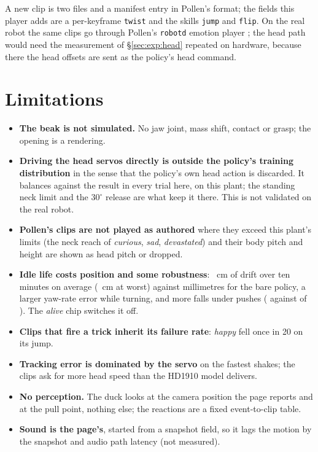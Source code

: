 \documentclass[11pt]{article}
\newcommand{\code}[1]{\texttt{\small #1}}
\begin{document}
A new clip is two files and a manifest entry in Pollen's format; the fields this player adds are a per-keyframe
\code{twist} and the skills \code{jump} and \code{flip}. On the real robot the same clips go through Pollen's
\code{robotd} emotion player \cite{microduck}; the head path would need the measurement of \S\ref{sec:exp:head}
repeated on hardware, because there the head offsets are sent as the policy's head command.

\section{Limitations}
\begin{itemize}[nosep]
\item \textbf{The beak is not simulated.} No jaw joint, mass shift, contact or grasp; the opening is a rendering.
\item \textbf{Driving the head servos directly is outside the policy's training distribution} in the sense that the
  policy's own head action is discarded. It balances against the result in every trial here, on this plant; the
  standing neck limit and the $30^\circ$ release are what keep it there. This is not validated on the real robot.
\item \textbf{Pollen's clips are not played as authored} where they exceed this plant's limits (the neck reach of
  \emph{curious}, \emph{sad}, \emph{devastated}) and their body pitch and height are shown as head pitch or dropped.
\item \textbf{Idle life costs position and some robustness}: \idleDrift~cm of drift over ten minutes on average
  (\idleDriftMax~cm at worst) against millimetres for the bare policy, a larger yaw-rate error while turning, and
  more falls under pushes (\pushLiveFell{} against \pushBareFell{} of \pushN). The \emph{alive} chip switches it off.
\item \textbf{Clips that fire a trick inherit its failure rate}: \emph{happy} fell once in 20 on its jump.
\item \textbf{Tracking error is dominated by the servo} on the fastest shakes; the clips ask for more head speed
  than the HD1910 model delivers.
\item \textbf{No perception.} The duck looks at the camera position the page reports and at the pull point, nothing
  else; the reactions are a fixed event-to-clip table.
\item \textbf{Sound is the page's}, started from a snapshot field, so it lags the motion by the snapshot and audio
  path latency (not measured).
\end{itemize}
\end{document}
